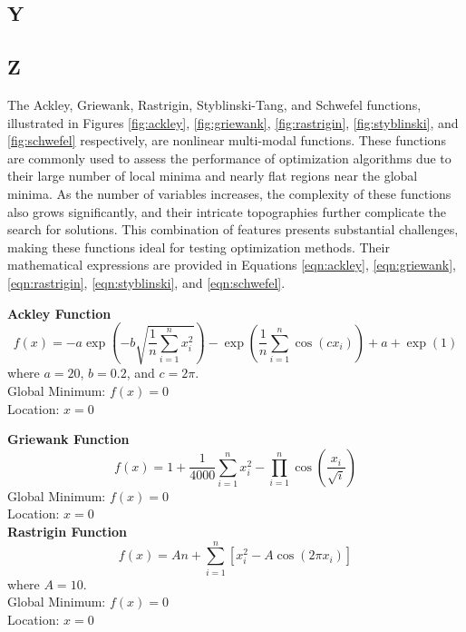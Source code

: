\documentclass[paper,revised]{geophysics}
\begin{document}
\subsection{Y}
\subsection{Z}
\begin{acknowledgments}

\end{acknowledgments}

 \label{appendix_1}
The Ackley, Griewank, Rastrigin, Styblinski-Tang, and Schwefel functions, illustrated in Figures \ref{fig:ackley}, \ref{fig:griewank}, \ref{fig:rastrigin}, \ref{fig:styblinski}, and \ref{fig:schwefel} respectively, are nonlinear multi-modal functions. These functions are commonly used to assess the performance of optimization algorithms due to their large number of local minima and nearly flat regions near the global minima. As the number of variables increases, the complexity of these functions also grows significantly, and their intricate topographies further complicate the search for solutions. This combination of features presents substantial challenges, making these functions ideal for testing optimization methods.
Their mathematical expressions are provided in Equations \ref{eqn:ackley}, \ref{eqn:griewank}, \ref{eqn:rastrigin}, \ref{eqn:styblinski}, and \ref{eqn:schwefel}.

{\bf{Ackley Function}}
\begin{equation}
	f(x) = -a \exp\left(-b \sqrt{\frac{1}{n} \sum_{i=1}^{n} x_i^2}\right) - \exp\left(\frac{1}{n} \sum_{i=1}^{n} \cos(c x_i)\right) + a + \exp(1)
\end{equation}
where \( a = 20 \), \( b = 0.2 \), and \( c = 2\pi \).\\
Global Minimum: \(f(x)=0\)\\
Location: \(x=0\)

{\bf{Griewank Function}}
\begin{equation}
	f(x) = 1 + \frac{1}{4000} \sum_{i=1}^{n} x_i^2 - \prod_{i=1}^{n} \cos\left(\frac{x_i}{\sqrt{i}}\right)
\end{equation}
Global Minimum: \(f(x)=0\)\\
Location: \(x=0\)\\

{\bf{Rastrigin Function}}
\begin{equation}
	f(x) = A n + \sum_{i=1}^{n} \left[ x_i^2 - A \cos(2 \pi x_i) \right]
\end{equation}
where \( A = 10 \).\\
Global Minimum: \(f(x)=0\)\\
Location: \(x=0\)
\end{document}
